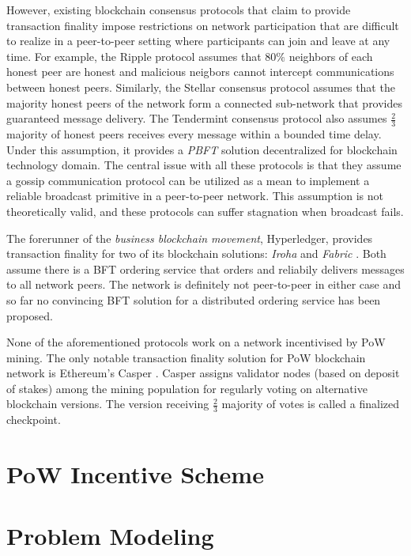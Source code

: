 \documentclass[conference]{IEEEtran}
\begin{document}
However, existing blockchain consensus protocols that claim to provide transaction finality impose restrictions on network participation that are difficult to realize in a peer-to-peer setting where participants can join and leave at any time. For example, the Ripple \cite{David2014TheRP} protocol assumes that $80\%$ neighbors of each honest peer are honest and malicious neigbors cannot intercept communications between honest peers. Similarly, the Stellar consensus protocol \cite{Mazires15thestellar} assumes that the majority honest peers of the network form a connected sub-network that provides guaranteed message delivery. The Tendermint consensus protocol \cite{Buchman2018TheLG} also assumes $\frac{2}{3}$ majority of honest peers receives every message within a bounded time delay. Under this assumption, it provides a \textit{PBFT} \cite{Castro:1999:PBF:296806.296824} solution decentralized for blockchain technology domain. The central issue with all these protocols is that they assume a gossip communication protocol \cite{gossip} can be utilized as a mean to implement a reliable broadcast primitive \cite{Jalote:1994:FTD:179250} in a peer-to-peer network. This assumption is not theoretically valid, and these protocols can suffer stagnation when broadcast fails.          

The forerunner of the \textit{business blockchain movement}, Hyperledger, provides transaction finality for two of its blockchain solutions: \textit{Iroha} \cite{yac} and \textit{Fabric} \cite{patent:20180150799}. Both assume there is a BFT ordering service that orders and reliabily delivers messages to all network peers. The network is definitely not peer-to-peer in either case and so far no convincing BFT solution for a distributed ordering service has been proposed. 

None of the aforementioned protocols work on a network incentivised by PoW mining. The only notable transaction finality solution for PoW blockchain network is Ethereum's Casper \cite{casper-gadget}. Casper assigns validator nodes (based on deposit of stakes) among the mining population for regularly voting on alternative blockchain versions. The version receiving $\frac{2}{3}$ majority of votes is called a finalized checkpoint.            

\section{PoW Incentive Scheme}
\label{s-incentive}

\section{Problem Modeling}
\label{s-model}
\end{document}

